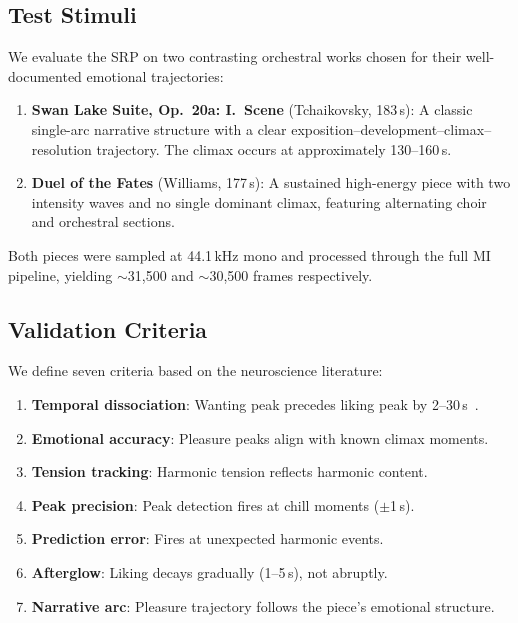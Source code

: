\documentclass[10pt,twocolumn]{article}
\begin{document}
\subsection{Test Stimuli}

We evaluate the SRP on two contrasting orchestral works chosen for their well-documented emotional trajectories:

\begin{enumerate}
\item \textbf{Swan Lake Suite, Op.~20a: I.~Scene} (Tchaikovsky, 183\,s): A classic single-arc narrative structure with a clear exposition--development--climax--resolution trajectory. The climax occurs at approximately 130--160\,s.
\item \textbf{Duel of the Fates} (Williams, 177\,s): A sustained high-energy piece with two intensity waves and no single dominant climax, featuring alternating choir and orchestral sections.
\end{enumerate}

\noindent Both pieces were sampled at 44.1\,kHz mono and processed through the full MI pipeline, yielding $\sim$31{,}500 and $\sim$30{,}500 frames respectively.

\subsection{Validation Criteria}

We define seven criteria based on the neuroscience literature:

\begin{enumerate}[label=\textbf{V\arabic*}]
\item \textbf{Temporal dissociation}: Wanting peak precedes liking peak by 2--30\,s~\cite{Salimpoor2011}.
\item \textbf{Emotional accuracy}: Pleasure peaks align with known climax moments.
\item \textbf{Tension tracking}: Harmonic tension reflects harmonic content.
\item \textbf{Peak precision}: Peak detection fires at chill moments ($\pm$1\,s).
\item \textbf{Prediction error}: Fires at unexpected harmonic events.
\item \textbf{Afterglow}: Liking decays gradually (1--5\,s), not abruptly.
\item \textbf{Narrative arc}: Pleasure trajectory follows the piece's emotional structure.
\end{enumerate}
\end{document}
